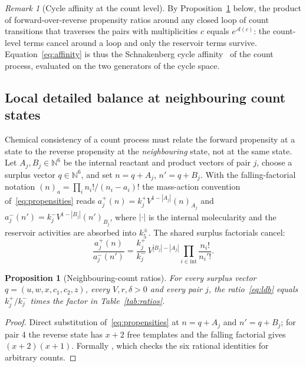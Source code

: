\documentclass[11pt,a4paper]{article}
\theoremstyle{plain}
\newtheorem{proposition}[theorem]{Proposition}
\theoremstyle{definition}
\theoremstyle{remark}
\newtheorem{remark}[theorem]{Remark}
\newcommand{\N}{\mathbb N}
\newcommand{\Aff}{\mathcal A}
\begin{document}
\begin{remark}[Cycle affinity at the count level]\label{rem:schnakenberg}
By Proposition~\ref{prop:ldb} below, the product of forward-over-reverse propensity ratios around any closed loop of count transitions that traverses the pairs with multiplicities $c$ equals $e^{\Aff(c)}$: the count-level terms cancel around a loop and only the reservoir terms survive. Equation~\eqref{eq:affinity} is thus the Schnakenberg cycle affinity~\citep{schnakenberg1976} of the count process, evaluated on the two generators of the cycle space.
\end{remark}

\subsection{Local detailed balance at neighbouring count states}
Chemical consistency of a count process must relate the forward propensity at a state to the reverse propensity at the \emph{neighbouring} state, not at the same state. Let $A_j,B_j\in\N^6$ be the internal reactant and product vectors of pair $j$, choose a surplus vector $q\in\N^6$, and set $n=q+A_j$, $n'=q+B_j$. With the falling-factorial notation $(n)_a=\prod_in_i!/(n_i-a_i)!$ the mass-action convention of~\eqref{eq:propensities} reads $a_j^+(n)=k_j^+V^{1-|A_j|}(n)_{A_j}$ and $a_j^-(n')=k_j^-V^{1-|B_j|}(n')_{B_j}$, where $|\cdot|$ is the internal molecularity and the reservoir activities are absorbed into $k_5^\pm$. The shared surplus factorials cancel:
\begin{equation}\label{eq:ldb}
 \frac{a_j^+(n)}{a_j^-(n')}=\frac{k_j^+}{k_j^-}\,V^{|B_j|-|A_j|}\prod_{i\in\mathrm{int}}\frac{n_i!}{n_i'!}.
\end{equation}

\begin{proposition}[Neighbouring-count ratios]\label{prop:ldb}
For every surplus vector $q=(u,w,x,c_1,c_2,z)$, every $V,r,\delta>0$ and every pair $j$, the ratio~\eqref{eq:ldb} equals $k_j^+/k_j^-$ times the factor in Table~\ref{tab:ratios}.
\end{proposition}
\begin{proof}
Direct substitution of~\eqref{eq:propensities} at $n=q+A_j$ and $n'=q+B_j$; for pair 4 the reverse state has $x+2$ free templates and the falling factorial gives $(x+2)(x+1)$. Formally , which checks the six rational identities for arbitrary counts.
\end{proof}
\end{document}
